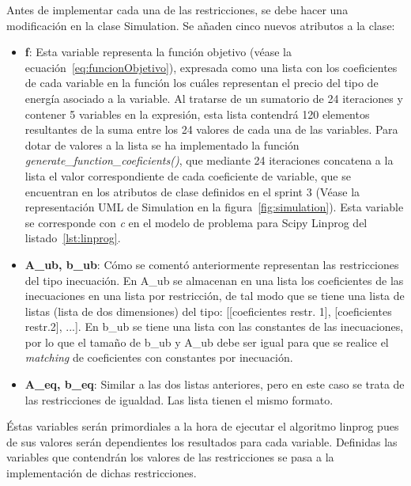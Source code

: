 Antes de implementar cada una de las restricciones, se debe hacer una modificación en la clase Simulation. Se añaden cinco nuevos atributos a la clase:
\begin{itemize}
\item \textbf{f}: Esta variable representa la función objetivo (véase la ecuación~\ref{eq:funcionObjetivo}), expresada como una lista con los coeficientes de cada variable en la función los cuáles representan el precio del tipo de energía asociado a la variable. Al tratarse de un sumatorio de 24 iteraciones y contener 5 variables en la expresión, esta lista contendrá 120 elementos resultantes de la suma entre los 24 valores de cada una de las variables. Para dotar de valores a la lista se ha implementado la función \textit{generate\_function\_coeficients()}, que mediante 24 iteraciones concatena a la lista el valor correspondiente de cada coeficiente de variable, que se encuentran en los atributos de clase definidos en el sprint 3 (Véase la representación UML de Simulation en la figura~\ref{fig:simulation}). Esta variable se corresponde con \textit{c} en el modelo de problema para Scipy Linprog del listado~\ref{lst:linprog}.
\item \textbf{A\_ub, b\_ub}: Cómo se comentó anteriormente representan las restricciones del tipo inecuación. En A\_ub se almacenan en una lista los coeficientes de las inecuaciones en una lista por restricción, de tal modo que se tiene una lista de listas (lista de dos dimensiones) del tipo: [[coeficientes restr. 1], [coeficientes restr.2], ...]. En b\_ub se tiene una lista con las constantes de las inecuaciones, por lo que el tamaño de b\_ub y A\_ub debe ser igual para que se realice el \textit{matching} de coeficientes con constantes por inecuación.
\item \textbf{A\_eq, b\_eq}: Similar a las dos listas anteriores, pero en este caso se trata de las restricciones de igualdad. Las lista tienen el mismo formato.
\end{itemize}
Éstas variables serán primordiales a la hora de ejecutar el algoritmo linprog pues de sus valores serán dependientes los resultados para cada variable. Definidas las variables que contendrán los valores de las restricciones se pasa a la implementación de dichas restricciones.
